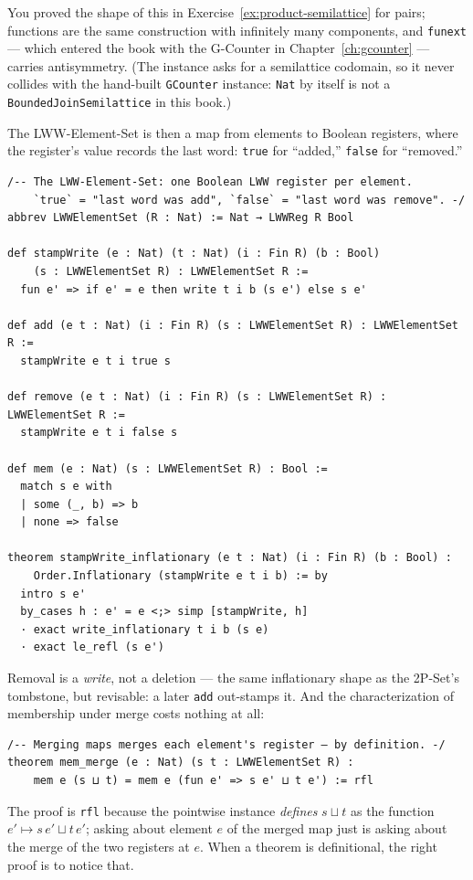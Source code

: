 \documentclass[12pt, a4paper, openright]{book}
\theoremstyle{thmstyle}
\theoremstyle{defstyle}
\newcommand{\lc}[1]{\texttt{#1}}
\begin{document}
You proved the shape of this in Exercise~\ref{ex:product-semilattice}
for pairs; functions are the same construction with infinitely many
components, and \lc{funext} --- which entered the book with the G-Counter
in Chapter~\ref{ch:gcounter} --- carries antisymmetry. (The instance asks
for a semilattice codomain, so it never collides with the hand-built
\lc{GCounter} instance: \lc{Nat} by itself is not a
\lc{BoundedJoinSemilattice} in this book.)

The LWW-Element-Set is then a map from elements to Boolean registers,
where the register's value records the last word: \lc{true} for
``added,'' \lc{false} for ``removed.''

\begin{verbatim}
/-- The LWW-Element-Set: one Boolean LWW register per element.
    `true` = "last word was add", `false` = "last word was remove". -/
abbrev LWWElementSet (R : Nat) := Nat → LWWReg R Bool

def stampWrite (e : Nat) (t : Nat) (i : Fin R) (b : Bool)
    (s : LWWElementSet R) : LWWElementSet R :=
  fun e' => if e' = e then write t i b (s e') else s e'

def add (e t : Nat) (i : Fin R) (s : LWWElementSet R) : LWWElementSet R :=
  stampWrite e t i true s

def remove (e t : Nat) (i : Fin R) (s : LWWElementSet R) : LWWElementSet R :=
  stampWrite e t i false s

def mem (e : Nat) (s : LWWElementSet R) : Bool :=
  match s e with
  | some (_, b) => b
  | none => false

theorem stampWrite_inflationary (e t : Nat) (i : Fin R) (b : Bool) :
    Order.Inflationary (stampWrite e t i b) := by
  intro s e'
  by_cases h : e' = e <;> simp [stampWrite, h]
  · exact write_inflationary t i b (s e)
  · exact le_refl (s e')
\end{verbatim}

Removal is a \emph{write}, not a deletion --- the same inflationary shape
as the 2P-Set's tombstone, but revisable: a later \lc{add} out-stamps
it. And the characterization of membership under merge costs nothing at
all:

\begin{verbatim}
/-- Merging maps merges each element's register — by definition. -/
theorem mem_merge (e : Nat) (s t : LWWElementSet R) :
    mem e (s ⊔ t) = mem e (fun e' => s e' ⊔ t e') := rfl
\end{verbatim}

The proof is \lc{rfl} because the pointwise instance \emph{defines}
$s \sqcup t$ as the function $e' \mapsto s\,e' \sqcup t\,e'$; asking
about element $e$ of the merged map just is asking about the merge of
the two registers at $e$. When a theorem is definitional, the right
proof is to notice that.
\end{document}
